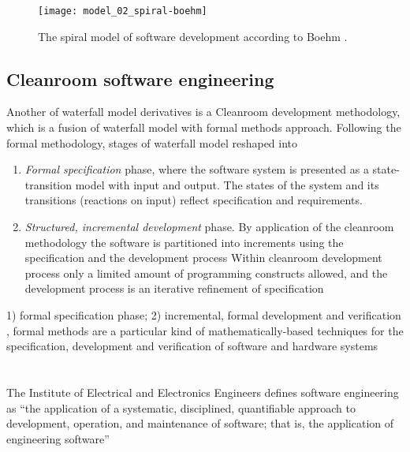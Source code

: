 \begin{figure}[tbp]
   \centering
   \texttt{[image: model\_02\_spiral-boehm]}
   \caption{The spiral model of software development according to Boehm \cite{citeulike:10002126}. }
   \label{fig:model_spiral}
\end{figure}



\subsection{Cleanroom software engineering}
Another of waterfall model derivatives is a Cleanroom development methodology, which is
a fusion of waterfall model with formal methods approach. 
Following the formal methodology, stages of waterfall model reshaped into 
\begin{enumerate}
 \item \textit{Formal specification} phase, where the software system is presented as 
a state-transition model with input and output. The states of the system and
its transitions (reactions on input) reflect specification and requirements.
 \item \textit{Structured, incremental development} phase. By application of the 
cleanroom methodology the software is partitioned into increments using the 
specification and the development process Within cleanroom
development process only a limited amount of programming constructs allowed,
and the development process is an iterative refinement of specification
\end{enumerate}

1) formal specification phase; 2) incremental, formal development and verification 
, formal methods are a particular kind of mathematically-based techniques for
the specification, development and verification of software and hardware systems

\section{}

The Institute of Electrical and Electronics Engineers defines software engineering as 
“the application of a systematic, disciplined, quantifiable approach to development, 
operation, and maintenance of software; that is, the application of engineering software”
